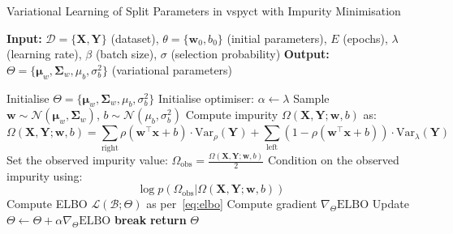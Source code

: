 \documentclass[3p,review,authoryear]{elsarticle}
\begin{document}
\begin{algorithm}[h!]
\caption{Variational Learning of Split Parameters in \gls{vspyct} with Impurity Minimisation}
\label{alg:learn_split_vb}
\begin{algorithmic}[1]
    \State \textbf{Input:} $\mathcal{D} = \{\mathbf{X}, \mathbf{Y}\}$ (dataset), $\theta = \{\mathbf{w}_0, b_0\}$ (initial parameters), $E$ (epochs), $\lambda$ (learning rate), $\beta$ (batch size), $\sigma$ (selection probability)
    \State \textbf{Output:} $\Theta = \{\boldsymbol{\mu}_w, \boldsymbol{\Sigma}_w, \mu_b, \sigma_b^2\}$ (variational parameters)
 
        \State Initialise $\Theta = \{\boldsymbol{\mu}_w, \boldsymbol{\Sigma}_w, \mu_b, \sigma_b^2\}$ 
        \State Initialise optimiser: $\alpha \gets \lambda$
         
                \State Sample $\mathbf{w} \sim \mathcal{N}(\boldsymbol{\mu}_w, \boldsymbol{\Sigma}_w)$, $b \sim \mathcal{N}(\mu_b, \sigma_b^2)$
                \State Compute impurity $\Omega(\mathbf{X}, \mathbf{Y}; \mathbf{w}, b)$ as:
                \[
                \Omega(\mathbf{X}, \mathbf{Y}; \mathbf{w}, b) = \sum_{\text{right}} \rho(\mathbf{w}^\top \mathbf{x} + b) \cdot \text{Var}_\rho(\mathbf{Y}) + \sum_{\text{left}} (1 - \rho(\mathbf{w}^\top \mathbf{x} + b)) \cdot \text{Var}_\lambda(\mathbf{Y})
                \]
                \State Set the observed impurity value: $\Omega_\text{obs} = \frac{\Omega(\mathbf{X}, \mathbf{Y}; \mathbf{w}, b)}{2}$
                \State Condition on the observed impurity using:
                \[
                \log p(\Omega_\text{obs}|\Omega(\mathbf{X}, \mathbf{Y}; \mathbf{w}, b))
                \]
                \State Compute ELBO $\mathcal{L}(\mathcal{B}; \Theta)$ as per~\eqref{eq:elbo}
                \State Compute gradient $\nabla_{\Theta} \text{ELBO}$
                \State Update $\Theta \gets \Theta + \alpha \nabla_{\Theta} \text{ELBO}$ 
            \EndFor
                \State \textbf{break}
            \EndIf
        \EndFor
        \State \textbf{return} $\Theta$
    \EndProcedure
\end{algorithmic}
\end{algorithm}
\end{document}
